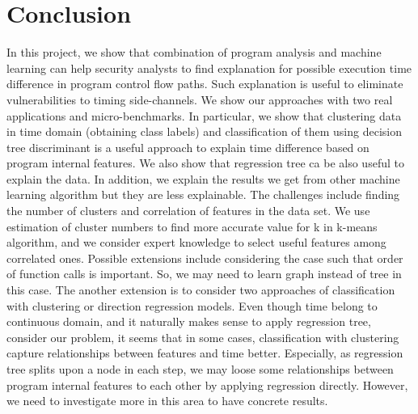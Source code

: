 \documentclass{article}
\begin{document}
\section{Conclusion}
In this project, we show that combination of program analysis and machine learning can help
security analysts to find explanation for possible execution time difference in program
control flow paths. Such explanation is useful to eliminate vulnerabilities to timing side-channels.
We show our approaches with two real applications and micro-benchmarks. In particular, we show
that clustering data in time domain (obtaining class labels) and classification of them using
decision tree discriminant is a useful approach to explain time difference based on program
internal features. We also show that regression tree ca be also useful to explain the data. In
addition, we explain the results we get from other machine learning algorithm but they are
less explainable. The challenges include finding the number of clusters and correlation
of features in the data set. We use estimation of cluster numbers to find more accurate
value for k in k-means algorithm, and we consider expert knowledge to select useful
features among correlated ones. Possible extensions include considering the case such
that order of function calls is important. So, we may need to learn graph instead of tree
in this case. The another extension is to consider two approaches of classification with
clustering or direction regression models. Even though time belong to continuous domain,
and it naturally makes sense to apply regression tree, consider our problem, it seems that
in some cases, classification with clustering capture relationships between features and
time better. Especially, as regression tree splits upon a node in each step, we may loose
some relationships between program internal features to each other by applying regression
directly. However, we need to investigate more in this area to have concrete results.  
\end{document}
